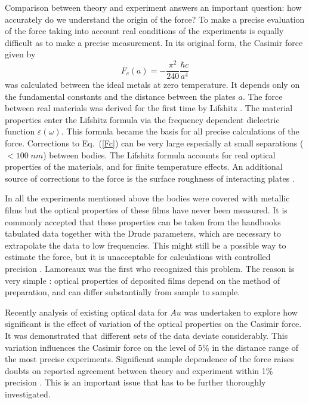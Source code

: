 \documentclass[prb]{revtex4}%
\begin{document}
Comparison between theory and experiment answers an important
question: how accurately do we understand the origin of the force?
To make a precise evaluation of the force taking into account real
conditions of the experiments is equally difficult as to make a
precise measurement. In its original form, the Casimir force
\cite{Cas48} given by
%
\begin{equation}
F_{c}\left( a\right) =-\frac{\pi ^{2}}{240}\frac{\hbar c}{a^{4}}
\label{Fc}
\end{equation}
%
was calculated between the ideal metals at zero temperature. It
depends only on the fundamental constants and the distance between
the plates $a$. The force between real materials was derived for the
first time by Lifshitz \cite {Lif56,DLP,LP9}. The material
properties enter the Lifshitz formula via the frequency dependent
dielectric function $\varepsilon \left( \omega \right) $. This
formula became the basis for all precise calculations of the force.
Corrections to Eq.~(\ref{Fc}) can be very large especially at small
separations ($<100\;nm$) between bodies.  The Lifshitz formula
accounts for real optical properties of the materials, and for
finite temperature effects. An additional source of corrections to
the force is the surface roughness of interacting plates
\cite{Kli96,Gen03,Mia05}.

In all the experiments mentioned above the bodies were covered with
metallic films but the optical properties of these films have never
been measured. It is commonly accepted
\cite{Har00,Dec03b,Dec05,Kli00} that these properties can be taken
from the handbooks tabulated data \cite{HB1,Wea81} together with the
Drude parameters, which are necessary to extrapolate the data to low
frequencies. This might still be a possible way to estimate the
force, but it is unacceptable  for calculations with controlled
precision . Lamoreaux \cite{Lam99b} was the first who recognized
this problem. The reason is very simple
\cite{Lam99b,Lam99a,Sve00a,Sve00b}: optical properties of deposited
films depend on the method of preparation, and can differ
substantially from sample to sample.

Recently analysis of existing optical data for $Au$ was undertaken
\cite{Pir06} to explore how significant is the effect of variation
of the optical properties on the Casimir force. It was demonstrated
that different sets of the data deviate considerably. This variation
influences the Casimir force on the level of 5\% in the distance
range of the most precise experiments. Significant sample dependence
of the force raises doubts on reported agreement between theory and
experiment within 1\% precision \cite{Har00,Dec05}. This is an
important issue that has to be further thoroughly investigated.
\end{document}
